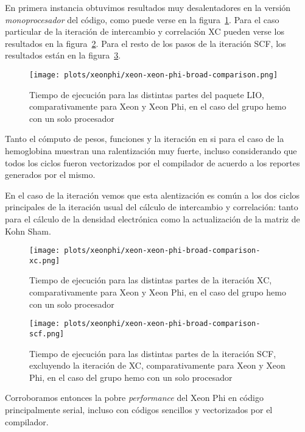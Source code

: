 En primera instancia obtuvimos resultados muy desalentadores en la versi\'on
\textit{monoprocesador} del c\'odigo, como puede verse en la figura~\ref{fig:prelim-xeon-phi}.
Para el caso particular de la iteraci\'on de intercambio y correlaci\'on XC pueden
verse los resultados en la figura~\ref{fig:prelim-xeon-phi-xc}. Para el resto de
los pasos de la iteraci\'on SCF, los resultados est\'an en la figura~\ref{fig:prelim-xeon-phi-scf}.

\begin{figure}[htbp]
   \centering
   \texttt{[image: plots/xeonphi/xeon-xeon-phi-broad-comparison.png]}
   \caption{Tiempo de ejecuci\'on para las distintas partes del paquete LIO,
   comparativamente para Xeon y Xeon Phi, en el caso del grupo hemo con un solo procesador}
   \label{fig:prelim-xeon-phi}
\end{figure}

Tanto el c\'omputo de pesos, funciones y la iteraci\'on en si para el caso de la
hemoglobina muestran una ralentizaci\'on muy fuerte, incluso considerando que
todos los ciclos fueron vectorizados por el compilador de acuerdo a los reportes
generados por el mismo.

En el caso de la iteraci\'on vemos que esta alentizaci\'on es com\'un a los dos
ciclos principales de la iteraci\'on usual del c\'alculo de intercambio y
correlaci\'on: tanto para el c\'alculo de la densidad electr\'onica como la
actualizaci\'on de la matriz de Kohn Sham.

\begin{figure}[htbp]
   \centering
   \texttt{[image: plots/xeonphi/xeon-xeon-phi-broad-comparison-xc.png]}
   \caption{Tiempo de ejecuci\'on para las distintas partes de la iteraci\'on XC,
   comparativamente para Xeon y Xeon Phi, en el caso del grupo hemo con un solo procesador}
   \label{fig:prelim-xeon-phi-xc}
\end{figure}

\begin{figure}[htbp]
   \centering
   \texttt{[image: plots/xeonphi/xeon-xeon-phi-broad-comparison-scf.png]}
   \caption{Tiempo de ejecuci\'on para las distintas partes de la iteraci\'on SCF,
   excluyendo la iteraci\'on de XC, comparativamente para Xeon y Xeon Phi, en el
   caso del grupo hemo con un solo procesador}
   \label{fig:prelim-xeon-phi-scf}
\end{figure}

Corroboramos entonces la pobre \textit{performance} del Xeon Phi en c\'odigo
principalmente serial, incluso con c\'odigos sencillos y vectorizados por el
compilador.

